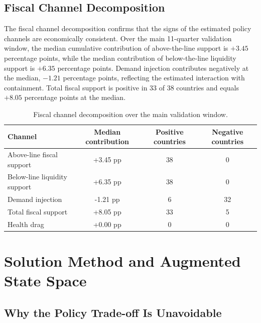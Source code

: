 \documentclass[12pt, a4paper]{article}
\begin{document}
\subsection{Fiscal Channel Decomposition}

The fiscal channel decomposition confirms that the signs of the estimated policy channels are economically consistent. Over the main 11-quarter validation window, the median cumulative contribution of above-the-line support is $+3.45$ percentage points, while the median contribution of below-the-line liquidity support is $+6.35$ percentage points. Demand injection contributes negatively at the median, $-1.21$ percentage points, reflecting the estimated interaction with containment. Total fiscal support is positive in 33 of 38 countries and equals $+8.05$ percentage points at the median.

\begin{table}[H]
\centering
\caption{Fiscal channel decomposition over the main validation window.}
\label{tab:fiscal_channel_decomposition}
\scriptsize
\begin{tabular}{lccc}
\toprule
\textbf{Channel} & \textbf{Median contribution} & \textbf{Positive countries} & \textbf{Negative countries} \\
\midrule
Above-line fiscal support & +3.45 pp & 38 & 0 \\
Below-line liquidity support & +6.35 pp & 38 & 0 \\
Demand injection & -1.21 pp & 6 & 32 \\
Total fiscal support & +8.05 pp & 33 & 5 \\
Health drag & +0.00 pp & 0 & 0 \\
\bottomrule
\end{tabular}
\end{table}








\section{Solution Method and Augmented State Space}
\label{app:planner}


\subsection{Why the Policy Trade-off Is Unavoidable}
\label{app:necessity}
\end{document}
